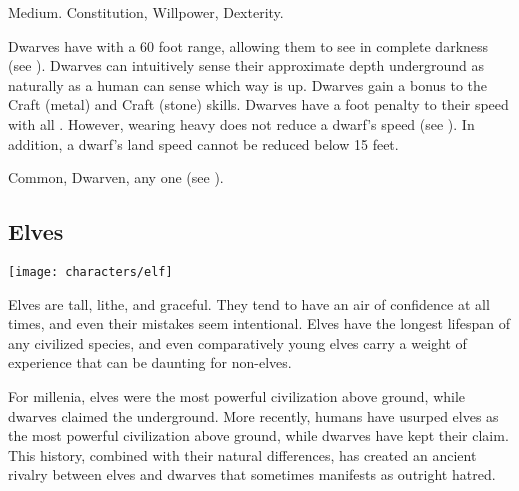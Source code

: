          Medium.
          Constitution,  Willpower,  Dexterity.
        \begin{raggeditemize}
             Dwarves have  with a 60 foot range, allowing them to see in complete darkness (see ).
             Dwarves can intuitively sense their approximate depth underground as naturally as a human can sense which way is up.
             Dwarves gain a  bonus to the Craft (metal) and Craft (stone) skills.
             Dwarves have a  foot penalty to their speed with all .
                However, wearing heavy  does not reduce a dwarf's speed (see ).
                In addition, a dwarf's land speed cannot be reduced below 15 feet.
        \end{raggeditemize}
         Common, Dwarven, any one  (see ).

    \subsection{Elves}
        \texttt{[image: characters/elf]}

        Elves are tall, lithe, and graceful.
        They tend to have an air of confidence at all times, and even their mistakes seem intentional.
        Elves have the longest lifespan of any civilized species, and even comparatively young elves carry a weight of experience that can be daunting for non-elves.

        For millenia, elves were the most powerful civilization above ground, while dwarves claimed the underground.
        More recently, humans have usurped elves as the most powerful civilization above ground, while dwarves have kept their claim.
        This history, combined with their natural differences, has created an ancient rivalry between elves and dwarves that sometimes manifests as outright hatred.

